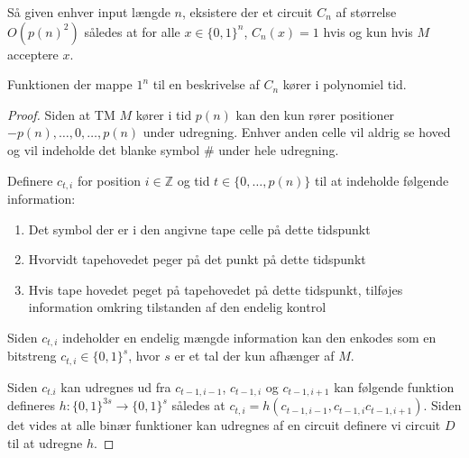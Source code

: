 \begin{itemize}
  Så given enhver input længde $n$, eksistere der et circuit $C_n$ af størrelse $O(p(n)^2)$ således at for alle $x \in \{0,1\}^n$, $C_n(x) = 1$ hvis og kun hvis $M$ acceptere $x$. \smallskip
  
  Funktionen der mappe $1^n$ til en beskrivelse af $C_n$ kører i polynomiel tid. 
  \begin{proof} 
    Siden at TM $M$ kører i tid $p(n)$ kan den kun rører positioner $-p(n), \dots, 0, \dots, p(n)$ under udregning. Enhver anden celle vil aldrig se hoved og vil indeholde det blanke symbol $\#$ under hele udregning. \smallskip

    Definere $c_{t,i}$ for position $i \in \mathbb Z$ og tid $t \in \{0,\dots,p(n)\}$ til at indeholde følgende information:
    \begin{enumerate}
    	\item Det symbol der er i den angivne tape celle på dette tidspunkt
      \item Hvorvidt tapehovedet peger på det punkt på dette tidspunkt
      \item Hvis tape hovedet peget på tapehovedet på dette tidspunkt, tilføjes information omkring tilstanden af den endelig kontrol 
    \end{enumerate}
    Siden $c_{t,i}$ indeholder en endelig mængde information kan den enkodes som en bitstreng $c_{t,i} \in \{0,1\}^s$, hvor $s$ er et tal der kun afhænger af $M$. \smallskip

    Siden $c_{t.i}$ kan udregnes ud fra $c_{t-1,i-1}$, $c_{t-1,i}$ og $c_{t-1,i+1}$ kan følgende funktion defineres $h: \{0,1\}^{3s} \rightarrow \{0,1\}^s$ således at $c_{t,i} = h(c_{t-1,i-1}, c_{t-1,i}  c_{t-1,i+1})$. Siden det vides at alle binær funktioner kan udregnes af en circuit definere vi circuit $D$ til at udregne $h$. \smallskip
    

\end{proof}
\end{itemize}
